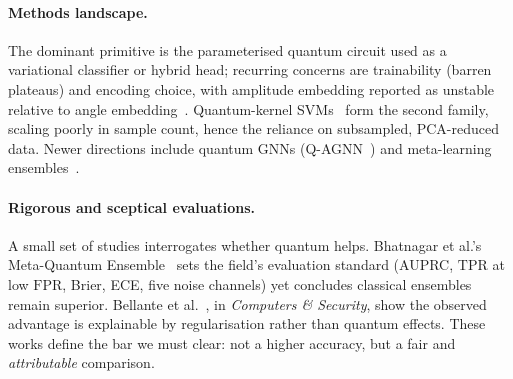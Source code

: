 \documentclass[preprint,11pt]{elsarticle}
\newcommand{\tpr}{\mathrm{TPR}}
\newcommand{\fpr}{\mathrm{FPR}}
\begin{document}
\paragraph{Methods landscape.}
The dominant primitive is the parameterised quantum circuit used as a variational classifier or
hybrid head; recurring concerns are trainability (barren plateaus) and encoding choice, with
amplitude embedding reported as unstable relative to angle embedding~\cite{wang2025quanconv}.
Quantum-kernel SVMs~\cite{kumari2025wavelet} form the second family, scaling poorly in sample
count, hence the reliance on subsampled, PCA-reduced data. Newer directions include quantum GNNs
(Q-AGNN~\cite{chaudhary2026qagnn}) and meta-learning ensembles~\cite{bhatnagar2026mqe}.

\paragraph{Rigorous and sceptical evaluations.}
A small set of studies interrogates whether quantum helps. Bhatnagar et al.'s Meta-Quantum
Ensemble~\cite{bhatnagar2026mqe} sets the field's evaluation standard (AUPRC, $\tpr$ at low
$\fpr$, Brier, ECE, five noise channels) yet concludes classical ensembles remain superior.
Bellante et al.~\cite{bellante2025pca}, in \emph{Computers \& Security}, show the observed
advantage is explainable by regularisation rather than quantum effects. These works define the
bar we must clear: not a higher accuracy, but a fair and \emph{attributable} comparison.
\end{document}
